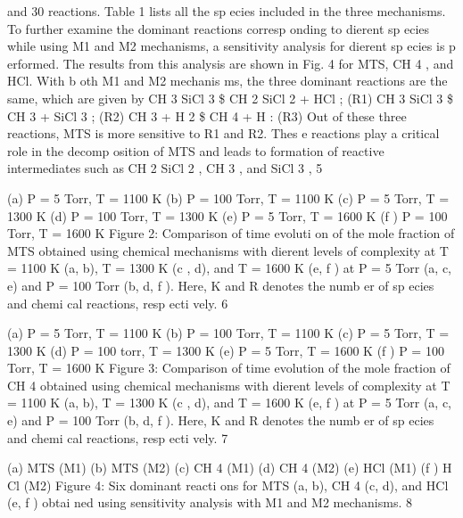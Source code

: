 \documentclass[10pt, letterpaper]{article}
\begin{document}
and 30 reactions. Table 1 lists all the sp ecies included in the three mechanisms.
To further examine the dominant reactions corresp onding to dierent sp ecies while using M1 and M2
mechanisms, a sensitivity analysis for dierent sp ecies is p erformed. The results from this analysis are shown
in Fig. 4 for MTS, CH
4
, and HCl. With b oth M1 and M2 mechanis ms, the three dominant reactions are the
same, which are given by
CH
3
SiCl
3
\$
CH
2
SiCl
2
+ HCl
;
(R1)
CH
3
SiCl
3
\$
CH
3
+ SiCl
3
;
(R2)
CH
3
+ H
2
\$
CH
4
+ H
:
(R3)
Out of these three reactions, MTS is more sensitive to R1 and R2. Thes e reactions play a critical role in the
decomp osition of MTS and leads to formation of reactive intermediates such as CH
2
SiCl
2
, CH
3
, and SiCl
3
,
5


(a)
P
= 5 Torr,
T
= 1100 K
(b)
P
= 100 Torr,
T
= 1100 K
(c)
P
= 5 Torr,
T
= 1300 K
(d)
P
= 100 Torr,
T
= 1300 K
(e)
P
= 5 Torr,
T
= 1600 K
(f )
P
= 100 Torr,
T
= 1600 K
Figure 2: Comparison of time evoluti on of the mole fraction of MTS obtained using chemical mechanisms with dierent levels
of complexity at T = 1100 K (a, b), T = 1300 K (c , d), and T = 1600 K (e, f ) at P = 5 Torr (a, c, e) and P = 100 Torr (b, d,
f ). Here, K and R denotes the numb er of sp ecies and chemi cal reactions, resp ecti vely.
6


(a)
P
= 5 Torr,
T
= 1100 K
(b)
P
= 100 Torr,
T
= 1100 K
(c)
P
= 5 Torr,
T
= 1300 K
(d)
P
= 100 torr,
T
= 1300 K
(e)
P
= 5 Torr,
T
= 1600 K
(f )
P
= 100 Torr,
T
= 1600 K
Figure 3: Comparison of time evolution of the mole fraction of CH
4
obtained using chemical mechanisms with dierent levels
of complexity at T = 1100 K (a, b), T = 1300 K (c , d), and T = 1600 K (e, f ) at P = 5 Torr (a, c, e) and P = 100 Torr (b, d,
f ). Here, K and R denotes the numb er of sp ecies and chemi cal reactions, resp ecti vely.
7


(a) MTS (M1)
(b) MTS (M2)
(c) CH
4
(M1)
(d) CH
4
(M2)
(e) HCl (M1)
(f ) H Cl (M2)
Figure 4: Six dominant reacti ons for MTS (a, b), CH
4
(c, d), and HCl (e, f ) obtai ned using sensitivity analysis with M1 and
M2 mechanisms.
8
\end{document}
